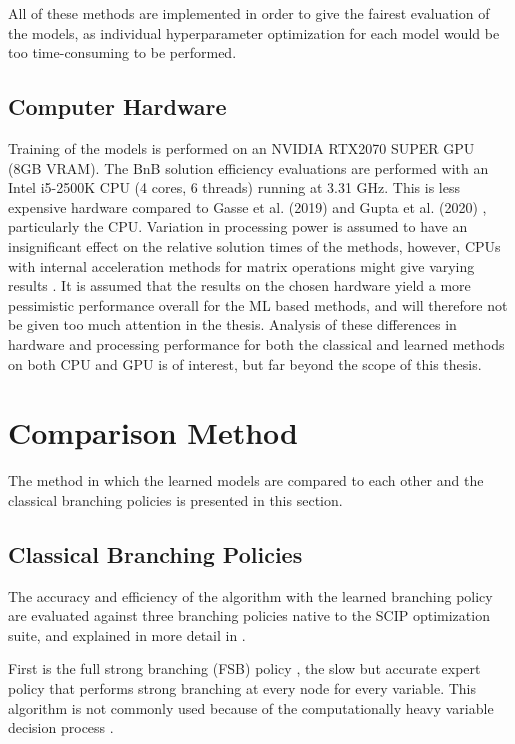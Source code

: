  All of these methods are implemented in order to give the fairest evaluation of the models, as individual hyperparameter optimization for each model would be too time-consuming to be performed. 


\subsection{Computer Hardware}

Training of the models is performed on an NVIDIA RTX2070 SUPER GPU (8GB VRAM). The \gls{BnB} solution efficiency evaluations are performed with an Intel i5-2500K \gls{CPU} (4 cores, 6 threads) running at 3.31 GHz. This is less expensive hardware compared to Gasse et al. (2019) \cite{gasse2019exact} and Gupta et al. (2020) \cite{gupta2020hybrid}, particularly the CPU. Variation in processing power is assumed to have an insignificant effect on the relative solution times of the methods, however, \gls{CPU}s with internal acceleration methods for matrix operations might give varying results \cite{vanhoucke2011improving}. It is assumed that the results on the chosen hardware yield a more pessimistic performance overall for the \gls{ML} based methods, and will therefore not be given too much attention in the thesis. Analysis of these differences in hardware and processing performance for both the classical and learned methods on both \gls{CPU} and \gls{GPU} is of interest, but far beyond the scope of this thesis. 



\section{Comparison Method}

The method in which the learned models are compared to each other and the classical branching policies is presented in this section.


\subsection{Classical Branching Policies}

The accuracy and efficiency of the algorithm with the learned branching policy are evaluated against three branching policies native to the \gls{SCIP} optimization suite, and explained in  more detail in . 

First is the full strong branching (\gls{FSB}) policy \cite{applegate1995finding}, the slow but accurate expert policy that performs strong branching at every node for every variable. This algorithm is not commonly used because of the computationally heavy variable decision process \cite{achterberg2004branching}.

